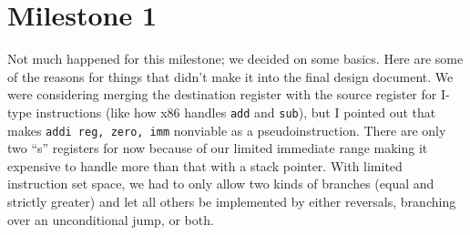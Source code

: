 \documentclass{report}
\begin{document}
\chapter{Milestone 1}
Not much happened for this milestone; we decided on some basics.
Here are some of the reasons for things that didn't make it into the final design document.
We were considering merging the destination register with the source register for I-type instructions (like how x86 handles \texttt{add} and \texttt{sub}), but I pointed out that makes \texttt{addi reg, zero, imm} nonviable as a pseudoinstruction.
There are only two ``s'' registers for now because of our limited immediate range making it expensive to handle more than that with a stack pointer.
With limited instruction set space, we had to only allow two kinds of branches (equal and strictly greater) and let all others be implemented by either reversals, branching over an unconditional jump, or both.
\end{document}
